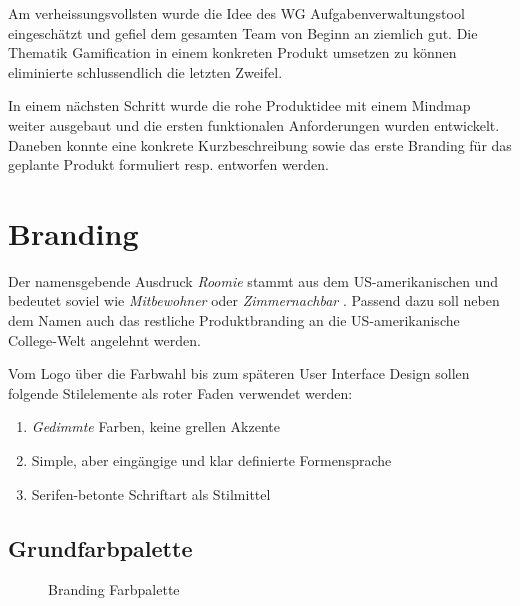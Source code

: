 Am verheissungsvollsten wurde die Idee des \gls{WG} Aufgabenverwaltungstool eingeschätzt und gefiel dem gesamten Team von Beginn an ziemlich gut. Die Thematik \gls{Gamification} in einem konkreten Produkt umsetzen zu können eliminierte schlussendlich die letzten Zweifel.

In einem nächsten Schritt wurde die rohe Produktidee mit einem Mindmap weiter ausgebaut und die ersten funktionalen Anforderungen wurden entwickelt. Daneben konnte eine konkrete Kurzbeschreibung sowie das erste Branding für das geplante Produkt formuliert resp. entworfen werden.

\section{Branding}
\label{sec:appendix-branding}

Der namensgebende Ausdruck \emph{Roomie} stammt aus dem US-amerikanischen und bedeutet soviel wie \emph{Mitbewohner} oder \emph{Zimmernachbar} \cite{Roomie}. Passend dazu soll neben dem Namen auch das restliche Produktbranding an die US-amerikanische College-Welt angelehnt werden.

Vom Logo über die Farbwahl bis zum späteren User Interface Design sollen folgende Stilelemente als roter Faden verwendet werden:

\begin{enumerate}
	\item \emph{Gedimmte} Farben, keine grellen Akzente
	\item Simple, aber eingängige und klar definierte Formensprache
	\item Serifen-betonte Schriftart als Stilmittel
\end{enumerate}

\subsection*{Grundfarbpalette}
\begin{figure}[H]

	\caption{Branding Farbpalette}
\end{figure}

